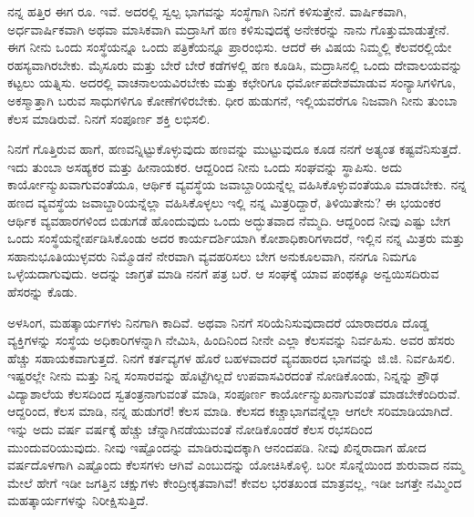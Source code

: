 ನನ್ನ ಹತ್ತಿರ ಈಗ ರೂ.  ಇವೆ. ಅದರಲ್ಲಿ ಸ್ವಲ್ಪ ಭಾಗವನ್ನು ಸಂಸ್ಥೆಗಾಗಿ ನಿನಗೆ ಕಳಿಸುತ್ತೇನೆ. ವಾರ್ಷಿಕವಾಗಿ, ಅರ್ಧವಾರ್ಷಿಕವಾಗಿ ಅಥವಾ ಮಾಸಿಕವಾಗಿ ಮದ್ರಾಸಿಗೆ ಹಣ ಕಳಿಸುವುದಕ್ಕೆ ಅನೇಕರನ್ನು ನಾನು ಗೊತ್ತುಮಾಡುತ್ತೇನೆ. ಈಗ ನೀನು ಒಂದು ಸಂಸ್ಥೆಯನ್ನೂ ಒಂದು ಪತ್ರಿಕೆಯನ್ನೂ ಪ್ರಾರಂಭಿಸು. ಆದರೆ ಈ ವಿಷಯ ನಿಮ್ಮಲ್ಲಿ ಕೆಲವರಲ್ಲಿಯೇ ರಹಸ್ಯವಾಗಿರಬೇಕು. ಮೈಸೂರು ಮತ್ತು ಬೇರೆ ಬೇರೆ ಕಡೆಗಳಲ್ಲಿ ಹಣ ಕೂಡಿಸಿ, ಮದ್ರಾಸಿನಲ್ಲಿ ಒಂದು ದೇವಾಲಯವನ್ನು ಕಟ್ಟಲು ಯತ್ನಿಸು. ಅದರಲ್ಲಿ ವಾಚನಾಲಯವಿರಬೇಕು ಮತ್ತು ಕಛೇರಿಗೂ ಧರ್ಮೋಪದೇಶಮಾಡುವ ಸಂನ್ಯಾಸಿಗಳಿಗೂ, ಅಕಸ್ಮಾತ್ತಾಗಿ ಬರುವ ಸಾಧುಗಳಿಗೂ ಕೋಣೆಗಳಿರಬೇಕು. ಧೀರ ಹುಡುಗನೆ, ಇಲ್ಲಿಯವರೆಗೂ ನಿಜವಾಗಿ ನೀನು ತುಂಬಾ ಕೆಲಸ ಮಾಡಿರುವೆ. ನಿನಗೆ ಸಂಪೂರ್ಣ ಶಕ್ತಿ ಲಭಿಸಲಿ.

\vspace{0.2cm}

ನಿನಗೆ ಗೊತ್ತಿರುವ ಹಾಗೆ, ಹಣವನ್ನಿಟ್ಟುಕೊಳ್ಳುವುದು ಹಣವನ್ನು ಮುಟ್ಟುವುದೂ ಕೂಡ ನನಗೆ ಅತ್ಯಂತ ಕಷ್ಟವೆನಿಸುತ್ತದೆ. ಇದು ತುಂಬಾ ಅಸಹ್ಯಕರ ಮತ್ತು ಹೀನಾಯಕರ. ಆದ್ದರಿಂದ ನೀನು ಒಂದು ಸಂಘವನ್ನು ಸ್ಥಾಪಿಸು. ಅದು ಕಾರ್ಯೋನ್ಮುಖವಾಗುವಂತೆಯೂ, ಆರ್ಥಿಕ ವ್ಯವಸ್ಥೆಯ ಜವಾಬ್ದಾರಿಯನ್ನೆಲ್ಲ ವಹಿಸಿಕೊಳ್ಳುವಂತೆಯೂ ಮಾಡಬೇಕು. ನನ್ನ ಹಣದ ವ್ಯವಸ್ಥೆಯ ಜವಾಬ್ದಾರಿಯನ್ನೆಲ್ಲಾ ವಹಿಸಿಕೊಳ್ಳಲು ಇಲ್ಲಿ ನನ್ನ ಮಿತ್ರರಿದ್ದಾರೆ, ತಿಳಿಯಿತೇನು? ಈ ಭಯಂಕರ ಆರ್ಥಿಕ ವ್ಯವಹಾರಗಳಿಂದ ಬಿಡುಗಡೆ ಹೊಂದುವುದು ಒಂದು ಅದ್ಭುತವಾದ ನೆಮ್ಮದಿ. ಆದ್ದರಿಂದ ನೀವು ಎಷ್ಟು ಬೇಗ ಒಂದು ಸಂಸ್ಥೆಯನ್ನೇರ್ಪಡಿಸಿಕೊಂಡು ಅದರ ಕಾರ್ಯದರ್ಶಿಯಾಗಿ ಕೋಶಾಧಿಕಾರಿಗಳಾದರೆ, ಇಲ್ಲಿನ ನನ್ನ ಮಿತ್ರರು ಮತ್ತು ಸಹಾನುಭೂತಿಯುಳ್ಳವರು ನಿಮ್ಮೊಡನೆ ನೇರವಾಗಿ ವ್ಯವಹರಿಸಲು ಬೇಗ ಅನುಕೂಲವಾಗಿ, ನನಗೂ ನಿಮಗೂ ಒಳ್ಳೆಯದಾಗುವುದು. ಅದನ್ನು ಜಾಗ್ರತೆ ಮಾಡಿ ನನಗೆ ಪತ್ರ ಬರೆ. ಆ ಸಂಘಕ್ಕೆ ಯಾವ ಪಂಥಕ್ಕೂ ಅನ್ವಯಿಸದಿರುವ ಹೆಸರನ್ನು ಕೊಡು.

\vspace{0.2cm}

ಅಳಸಿಂಗ, ಮಹತ್ಕಾರ್ಯಗಳು ನಿನಗಾಗಿ ಕಾದಿವೆ. ಅಥವಾ ನಿನಗೆ ಸರಿಯೆನಿಸುವುದಾದರೆ ಯಾರಾದರೂ ದೊಡ್ಡ ವ್ಯಕ್ತಿಗಳನ್ನು ಸಂಸ್ಥೆಯ ಅಧಿಕಾರಿಗಳನ್ನಾಗಿ ನೇಮಿಸಿ, ಹಿಂದಿನಿಂದ ನೀನೇ ಎಲ್ಲಾ ಕೆಲಸವನ್ನು ನಿರ್ವಹಿಸು. ಅವರ ಹೆಸರು ಹೆಚ್ಚು ಸಹಾಯಕವಾಗುತ್ತದೆ. ನಿನಗೆ ಕರ್ತವ್ಯಗಳ ಹೊರೆ ಬಹಳವಾದರೆ ವ್ಯವಹಾರದ ಭಾಗವನ್ನು ಜಿ.ಜಿ. ನಿರ್ವಹಿಸಲಿ. ಇಷ್ಟರಲ್ಲೇ ನೀನು ಮತ್ತು ನಿನ್ನ ಸಂಸಾರವನ್ನು ಹೊಟ್ಟೆಗಿಲ್ಲದೆ ಉಪವಾಸವಿರದಂತೆ ನೋಡಿಕೊಂಡು, ನಿನ್ನನ್ನು ಪ್ರೌಢ ವಿದ್ಯಾಶಾಲೆಯ ಕೆಲಸದಿಂದ ಸ್ವತಂತ್ರನಾಗುವಂತೆ ಮಾಡಿ, ಸಂಪೂರ್ಣ ಕಾರ್ಯೋನ್ಮುಖನಾಗುವಂತೆ ಮಾಡಬೇಕೆಂದಿರುವೆ. ಆದ್ದರಿಂದ, ಕೆಲಸ ಮಾಡಿ, ನನ್ನ ಹುಡುಗರೆ! ಕೆಲಸ ಮಾಡಿ. ಕೆಲಸದ ಕಚ್ಚಾಭಾಗವನ್ನೆಲ್ಲಾ ಆಗಲೇ ಸರಿಮಾಡಿಯಾಗಿದೆ. ಇನ್ನು ಅದು ವರ್ಷ ವರ್ಷಕ್ಕೆ ಹೆಚ್ಚು ಚೆನ್ನಾಗಿನಡೆಯುವಂತೆ ನೋಡಿಕೊಂಡರೆ ಕೆಲಸ ರಭಸದಿಂದ ಮುಂದುವರಿಯುವುದು. ನೀವು ಇಷ್ಟೊಂದನ್ನು ಮಾಡಿರುವುದಕ್ಕಾಗಿ ಆನಂದಪಡಿ. ನೀವು ಖಿನ್ನರಾದಾಗ ಹೋದ ವರ್ಷದೊಳಗಾಗಿ ಎಷ್ಟೊಂದು ಕೆಲಸಗಳು ಆಗಿವೆ ಎಂಬುದನ್ನು ಯೋಚಿಸಿಕೊಳ್ಳಿ. ಬರೀ ಸೊನ್ನೆಯಿಂದ ಶುರುವಾದ ನಮ್ಮ ಮೇಲೆ ಹೇಗೆ ಇಡೀ ಜಗತ್ತಿನ ಚಕ್ಷುಗಳು ಕೇಂದ್ರೀಕೃತವಾಗಿವೆ! ಕೇವಲ ಭರತಖಂಡ ಮಾತ್ರವಲ್ಲ, ಇಡೀ ಜಗತ್ತೇ ನಮ್ಮಿಂದ ಮಹತ್ಕಾರ್ಯಗಳನ್ನು ನಿರೀಕ್ಷಿಸುತ್ತಿದೆ.

\vspace{0.2cm}

